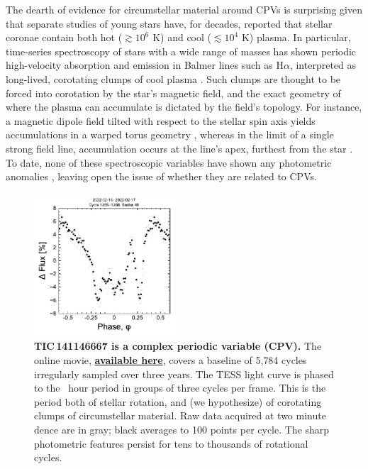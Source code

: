 \documentclass[11pt,twocolumn,tighten,linenumbers]{aastex7}
\begin{document}
The dearth of evidence for circumstellar material around CPVs is
surprising given that separate studies of young stars have, for
decades, reported that stellar coronae contain both hot
($\gtrsim$$10^6$ K) and cool ($\lesssim$$10^4$ K) plasma. In
particular, time-series spectroscopy of stars with a wide range of
masses has shown periodic high-velocity absorption and emission in
Balmer lines such as H$\alpha$, interpreted as long-lived, corotating
clumps of cool plasma
\citep{CollierCameron1989,CollierCameron1992,Barnes2000,Donati2000,Dunstone2006,Skelly2008,Leitzinger2016,Cang2021}.
Such clumps are thought to be forced into corotation by the star's magnetic
field, and the exact geometry of where the plasma can accumulate is
dictated by the field's topology.  For instance, a magnetic dipole
field tilted with respect to the stellar spin axis yields
accumulations in a warped torus geometry \citep{Townsend2005}, whereas
in the limit of a single strong field line, accumulation occurs at the
line's apex, furthest from the star \citep{Waugh2022}.  To date, none
of these spectroscopic variables have shown any photometric anomalies
\citep{Bouma2024}, leaving open the issue of whether they are related
to CPVs.

\begin{figure}[!t]
  \centering
  \includegraphics[width=0.47\textwidth]{f1.pdf}
  \vspace{-0.4cm}
  \captionsetup{labelformat=moviefmt,labelsep=colon}
	\caption{\textbf{TIC\,141146667 is a complex periodic variable (CPV).}  The
online movie,
  \href{https://lgbouma.com/movies/TIC141146667_20250116.mp4}{{\bf
  available here}},
  covers a baseline of 5{,}784 cycles irregularly sampled over three
  years.  The TESS light curve is phased to the \periodhr\ hour period
  in groups of three cycles per frame.  This is the period both of
  stellar rotation, and (we hypothesize) of corotating clumps of
  circumstellar material.  Raw data acquired at two minute dence
  are in gray; black averages to 100 points per cycle.  
  The sharp photometric features persist
  for tens to thousands of rotational cycles. }
  \label{fig:lc}
\end{figure}
\end{document}
